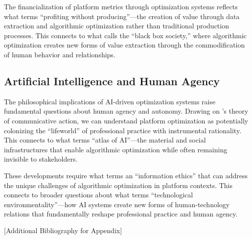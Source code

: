 The financialization of platform metrics through optimization systems reflects what \textcite{lapavitsas2013} terms ``profiting without producing''---the creation of value through data extraction and algorithmic optimization rather than traditional production processes. This connects to what \textcite{pasquale2015} calls the ``black box society,'' where algorithmic optimization creates new forms of value extraction through the commodification of human behavior and relationships.

\subsection{Artificial Intelligence and Human Agency}
The philosophical implications of AI-driven optimization systems raise fundamental questions about human agency and autonomy. Drawing on \textcite{habermas1984}'s theory of communicative action, we can understand platform optimization as potentially colonizing the ``lifeworld'' of professional practice with instrumental rationality. This connects to what \textcite{crawford2021} terms ``atlas of AI''---the material and social infrastructures that enable algorithmic optimization while often remaining invisible to stakeholders.

These developments require what \textcite{floridi2019} terms an ``information ethics'' that can address the unique challenges of algorithmic optimization in platform contexts. This connects to broader questions about what \textcite{coeckelbergh2020} terms ``technological environmentality''---how AI systems create new forms of human-technology relations that fundamentally reshape professional practice and human agency.

[Additional Bibliography for Appendix]

\nocite{bourdieu1977,coeckelbergh2020,crawford2021,deleuze1992,feenberg2019,floridi2019,foucault1977,habermas1984,hardt2017,harvey2018,heidegger1977,lapavitsas2013,moore2016,pasquale2015,simondon2017,srnicek2017,stiegler2010,stiegler2018,zuboff2019} 